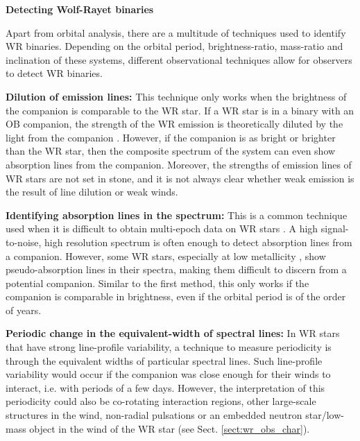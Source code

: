\textbf{Detecting Wolf-Rayet binaries}\label{sect:detection_methods}

Apart from orbital analysis, there are a multitude of techniques used to identify WR binaries. Depending on the orbital period, brightness-ratio, mass-ratio and inclination of these systems, different observational techniques allow for observers to detect WR binaries. 

\textbf{Dilution of emission lines:} This technique only works when the brightness of the companion is comparable to the WR star. If a WR star is in a binary with an OB companion, the strength of the WR emission is theoretically diluted by the light from the companion \citep{1968aSmith,1989ContiMassey,2007Crowther}. However, if the companion is as bright or brighter than the WR star, then the composite spectrum of the system can even show absorption lines from the companion. Moreover, the strengths of emission lines of WR stars are not set in stone, and it is not always clear whether weak emission is the result of line dilution or weak winds.

\textbf{Identifying absorption lines in the spectrum:} This is a common technique used when it is difficult to obtain multi-epoch data on WR stars \citep[e.g.,][]{1989ContiMassey}. A high signal-to-noise, high resolution spectrum is often enough to detect absorption lines from a companion. However, some WR stars, especially at low metallicity \citep[e.g.,][]{hainich_wolf-rayet_2015}, show pseudo-absorption lines in their spectra, making them difficult to discern from a potential companion. Similar to the first method, this only works if the companion is comparable in brightness, even if the orbital period is of the order of years. 

\textbf{Periodic change in the equivalent-width of spectral lines:} In WR stars that have strong line-profile variability, a technique to measure periodicity is through the equivalent widths of particular spectral lines. Such line-profile variability would occur if the companion was close enough for their winds to interact, i.e. with periods of a few days. However, the interpretation of this periodicity could also be co-rotating interaction regions, other large-scale structures in the wind, non-radial pulsations or an embedded neutron star/low-mass object in the wind of the WR star (see Sect. \ref{sect:wr_obs_char}). 

